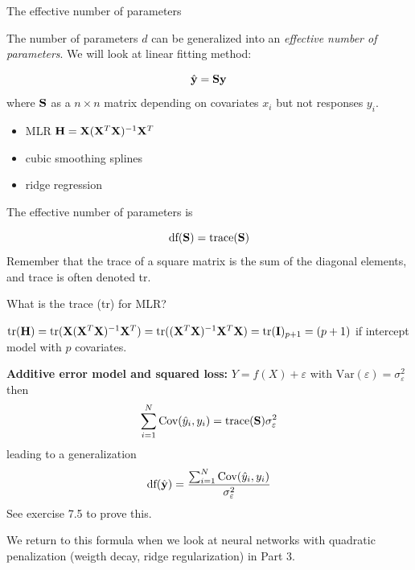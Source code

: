 \documentclass[
  ignorenonframetext,
]{beamer}
\providecommand{\tightlist}{%
  \setlength{\itemsep}{0pt}\setlength{\parskip}{0pt}}
\begin{document}
\begin{frame}

\begin{block}{The effective number of parameters}

The number of parameters \(d\) can be generalized into an
\emph{effective number of parameters}. We will look at linear fitting
method:

\[ \hat{\bf y}={\bf Sy}\] where \({\bf S}\) as a \(n \times n\) matrix
depending on covariates \(x_i\) but not responses \(y_i\).

\begin{itemize}
\tightlist
\item
  MLR \({\bf H}={\bf X}({\bf X}^T{\bf X})^{-1}{\bf X}^T\)
\item
  cubic smoothing splines
\item
  ridge regression
\end{itemize}

The effective number of parameters is

\[\text{df}({\bf S})=\text{trace}({\bf S})\] Remember that the trace of
a square matrix is the sum of the diagonal elements, and trace is often
denoted tr.

\end{block}

\end{frame}

\begin{frame}

What is the trace (tr) for MLR?

\(\text{tr}({\bf H})=\text{tr}({\bf X}({\bf X}^T{\bf X})^{-1}{\bf X}^T)=\text{tr}(({\bf X}^T{\bf X})^{-1}{\bf X}^T{\bf X})=\text{tr}({\bf I})_{p+1}=(p+1)\)
if intercept model with \(p\) covariates.

\end{frame}

\begin{frame}

\textbf{Additive error model and squared loss:} \(Y=f(X)+\varepsilon\)
with \(\text{Var}(\varepsilon)=\sigma_{\varepsilon}^2\) then
\[ \sum_{i=1}^N \text{Cov}(\hat{y}_i,y_i)=\text{trace}({\bf S})\sigma_{\varepsilon}^2\]
leading to a generalization
\[\text{df}(\hat{{\bf y}})=\frac{\sum_{i=1}^N \text{Cov}(\hat{y}_i,y_i)}{\sigma_{\varepsilon}^2}\]
See exercise 7.5 to prove this.

We return to this formula when we look at neural networks with quadratic
penalization (weigth decay, ridge regularization) in Part 3.

\end{frame}
\end{document}
